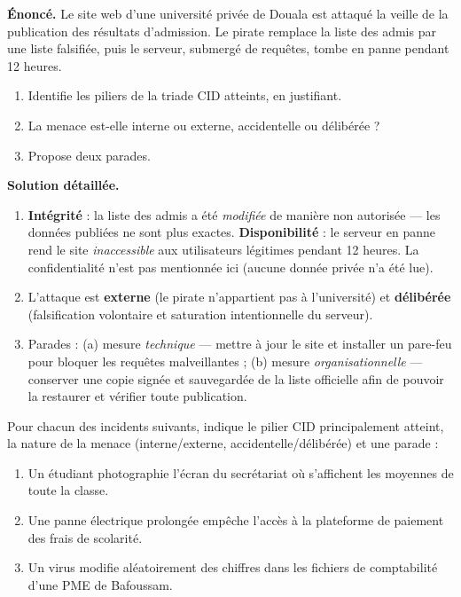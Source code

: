 \documentclass[11pt]{article}
\begin{document}
\begin{exoresolu}
\textbf{Énoncé.} Le site web d'une université privée de Douala est attaqué la veille de la publication des résultats d'admission. Le pirate remplace la liste des admis par une liste falsifiée, puis le serveur, submergé de requêtes, tombe en panne pendant 12 heures.
\begin{enumerate}
\item Identifie les piliers de la triade CID atteints, en justifiant.
\item La menace est-elle interne ou externe, accidentelle ou délibérée ?
\item Propose deux parades.
\end{enumerate}
\tcblower
\textbf{Solution détaillée.}
\begin{enumerate}
\item \textbf{Intégrité} : la liste des admis a été \emph{modifiée} de manière non autorisée — les données publiées ne sont plus exactes. \textbf{Disponibilité} : le serveur en panne rend le site \emph{inaccessible} aux utilisateurs légitimes pendant 12 heures. La confidentialité n'est pas mentionnée ici (aucune donnée privée n'a été lue).
\item L'attaque est \textbf{externe} (le pirate n'appartient pas à l'université) et \textbf{délibérée} (falsification volontaire et saturation intentionnelle du serveur).
\item Parades : (a) mesure \emph{technique} — mettre à jour le site et installer un pare-feu pour bloquer les requêtes malveillantes ; (b) mesure \emph{organisationnelle} — conserver une copie signée et sauvegardée de la liste officielle afin de pouvoir la restaurer et vérifier toute publication.
\end{enumerate}
\end{exoresolu}

\begin{exercice}
Pour chacun des incidents suivants, indique le pilier CID principalement atteint, la nature de la menace (interne/externe, accidentelle/délibérée) et une parade :
\begin{enumerate}
\item Un étudiant photographie l'écran du secrétariat où s'affichent les moyennes de toute la classe.
\item Une panne électrique prolongée empêche l'accès à la plateforme de paiement des frais de scolarité.
\item Un virus modifie aléatoirement des chiffres dans les fichiers de comptabilité d'une PME de Bafoussam.
\end{enumerate}
\end{exercice}
\end{document}
